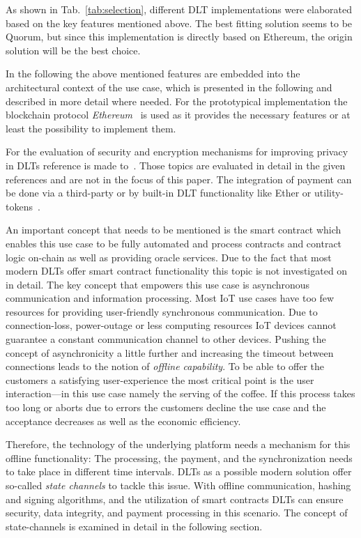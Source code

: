 \documentclass[conference]{IEEEtran}
\begin{document}
As shown in Tab.~\ref{tab:selection}, different DLT implementations were elaborated based on the key features mentioned above. The best fitting solution seems to be Quorum, but since this implementation is directly based on Ethereum, the origin solution will be the best choice.

In the following the above mentioned features are embedded into the architectural context of the use case, which is presented in the following and described in more detail where needed. For the prototypical implementation the blockchain protocol \emph{Ethereum}~\cite{buterin2013} is used as it provides the necessary features or at least the possibility to implement them.

For the evaluation of security and encryption mechanisms for improving privacy in DLTs reference is made to~\cite{Privacy}. Those topics are evaluated in detail in the given references and are not in the focus of this paper. The integration of payment can be done via a third-party or by built-in DLT functionality like Ether or utility-tokens~\cite{Tokens}.

An important concept that needs to be mentioned is the smart contract which enables this use case to be fully automated and process contracts and contract logic on-chain as well as providing oracle services. Due to the fact that most modern DLTs offer smart contract functionality this topic is not investigated on in detail. The key concept that empowers this use case is asynchronous communication and information processing. Most IoT use cases have too few resources for providing user-friendly synchronous communication. Due to connection-loss, power-outage or less computing resources IoT devices cannot guarantee a constant communication channel to other devices. Pushing the concept of asynchronicity a little further and increasing the timeout between connections leads to the notion of \emph{offline capability}. To be able to offer the customers a satisfying user-experience the most critical point is the user interaction---in this use case namely the serving of the coffee. If this process takes too long or aborts due to errors the customers decline the use case and the acceptance decreases as well as the economic efficiency.

Therefore, the technology of the underlying platform needs a mechanism for this offline functionality: The processing, the payment, and the synchronization needs to take place in different time intervals. DLTs as a possible modern solution offer so-called \emph{state channels} to tackle this issue. With offline communication, hashing and signing algorithms, and the utilization of smart contracts DLTs can ensure security, data integrity, and payment processing in this scenario. The concept of state-channels is examined in detail in the following section.
\end{document}
